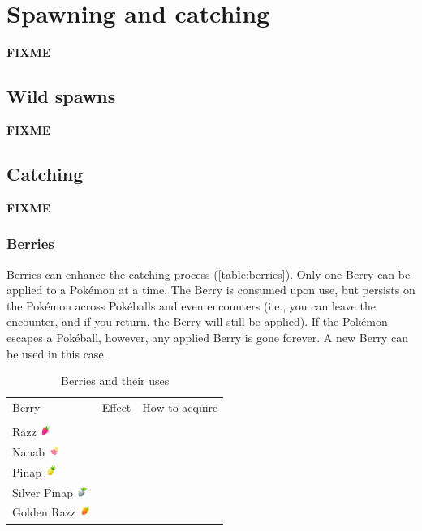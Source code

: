 \chapter{Spawning and catching}
\label{chap:spawn}
\textbf{FIXME}

\section{Wild spawns}
\label{sec:spawns}
\textbf{FIXME}

\section{Catching}
\label{sec:catch}
\textbf{FIXME}

\subsection{Berries}
Berries can enhance the catching process (\autoref{table:berries}).
Only one Berry can be applied to a Pokémon at a time.
The Berry is consumed upon use, but persists on the Pokémon across Pokéballs
  and even encounters (i.e., you can leave the encounter, and if you return,
  the Berry will still be applied).
If the Pokémon escapes a Pokéball, however, any applied Berry is gone forever.
A new Berry can be used in this case.

\begin{table}[ht]
\begin{center}
\begin{tabular}{lll}
Berry & Effect & How to acquire \\
\Midrule\\
Razz \includegraphics[width=1em]{images/razz.png} & & \\
Nanab \includegraphics[width=1em]{images/nanab.png} & & \\
Pinap \includegraphics[width=1em]{images/pinap.png} & & \\
Silver Pinap \includegraphics[width=1em]{images/silverpinap.png} & &\\
Golden Razz \includegraphics[width=1em]{images/goldenrazz.png} & & \\
\end{tabular}
\end{center}
\caption{Berries and their uses}
\label{table:berries}
\end{table}

